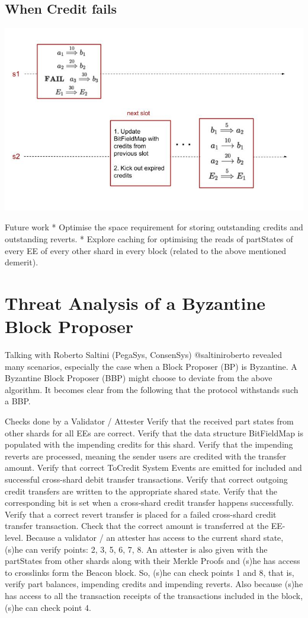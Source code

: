 \documentclass{article}
\begin{document}
\subsection{When Credit fails}
\includegraphics[scale=0.5]{Debit.jpg}

Future work
* Optimise the space requirement for storing outstanding credits and outstanding reverts.
* Explore caching for optimising the reads of partStates of every EE of every other shard in every block (related to the above mentioned demerit).

\section{Threat Analysis of a Byzantine Block Proposer}
\label{sec:threat}
Talking with Roberto Saltini (PegaSys, ConsenSys) @saltiniroberto revealed many scenarios, especially the case when a Block Proposer (BP) is Byzantine. A Byzantine Block Proposer (BBP) might choose to deviate from the above algorithm. It becomes clear from the following that the protocol withstands such a BBP.

Checks done by a Validator / Attester
Verify that the received part states from other shards for all EEs are correct.
Verify that the data structure BitFieldMap is populated with the impending credits for this shard.
Verify that the impending reverts are processed, meaning the sender users are credited with the transfer amount.
Verify that correct ToCredit System Events are emitted for included and successful cross-shard debit transfer transactions.
Verify that correct outgoing credit transfers are written to the appropriate shared state.
Verify that the corresponding bit is set when a cross-shard credit transfer happens successfully.
Verify that a correct revert transfer is placed for a failed cross-shard credit transfer transaction.
Check that the correct amount is transferred at the EE-level.
Because a validator / an attester has access to the current shard state, (s)he can verify points: 2, 3, 5, 6, 7, 8. An attester is also given with the partStates from other shards along with their Merkle Proofs and (s)he has access to crosslinks form the Beacon block. So, (s)he can check points 1 and 8, that is, verify part balances, impending credits and impending reverts. Also because (s)he has access to all the transaction receipts of the transactions included in the block, (s)he can check point 4.
\end{document}
